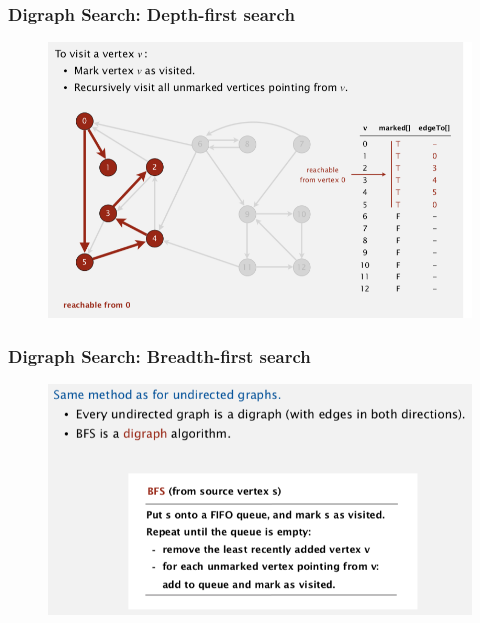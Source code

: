 \documentclass[11pt]{beamer}
\begin{document}
 \begin{frame}
	\frametitle	{Digraph Search: Depth-first search} 
	\begin{figure}
		\centering
		\includegraphics[width=0.9\linewidth]{"Screenshot 2020-12-03 at 7.11.20 AM"}
		\label{fig:screenshot-2020-12-03-at-7}
	\end{figure}	
\end{frame}

 \begin{frame}
	\frametitle	{Digraph Search: Breadth-first search} 
	\begin{figure}
		\centering
		\includegraphics[width=0.9\linewidth]{"Screenshot 2020-12-03 at 7.16.26 AM"}
		\label{fig:screenshot-2020-12-03-at-7}
	\end{figure}	
\end{frame}
\end{document}
